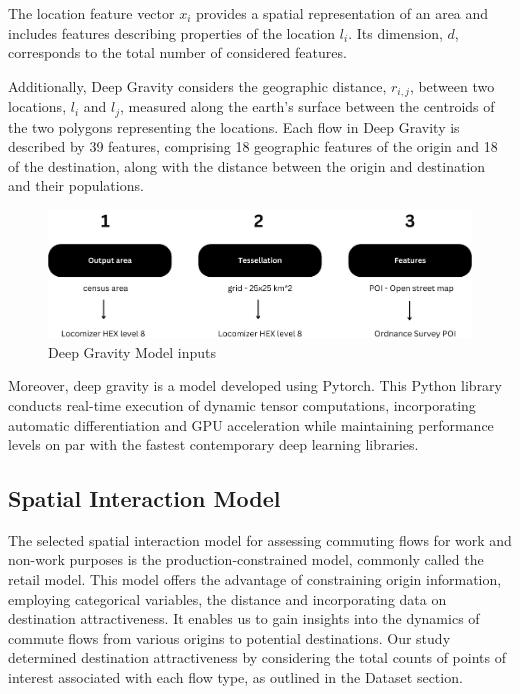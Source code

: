 The location feature vector $x_i$ provides a spatial representation of an area and includes features describing properties of the location $l_i$. Its dimension, $d$, corresponds to the total number of considered features.

Additionally, Deep Gravity considers the geographic distance, $r_{i,j}$, between two locations, $l_i$ and $l_j$, measured along the earth's surface between the centroids of the two polygons representing the locations. Each flow in Deep Gravity is described by 39 features, comprising 18 geographic features of the origin and 18 of the destination, along with the distance between the origin and destination and their populations.

    \begin{figure}[H]
        \centering
        \includegraphics[width=14cm]{Images/DG_Input.png}
        \caption{Deep Gravity Model inputs}
        \label{fig: DG_input}
    \end{figure}

Moreover, deep gravity is a model developed using Pytorch. This Python library conducts real-time execution of dynamic tensor computations, incorporating automatic differentiation and GPU acceleration while maintaining performance levels on par with the fastest contemporary deep learning libraries\citep{paszkePyTorchImperativeStyle2019}.  
    

\subsection{Spatial Interaction Model}

The selected spatial interaction model for assessing commuting flows for work and non-work purposes is the production-constrained model, commonly called the retail model. This model offers the advantage of constraining origin information, employing categorical variables, the distance and incorporating data on destination attractiveness. It enables us to gain insights into the dynamics of commute flows from various origins to potential destinations. Our study determined destination attractiveness by considering the total counts of points of interest associated with each flow type, as outlined in the Dataset section.


